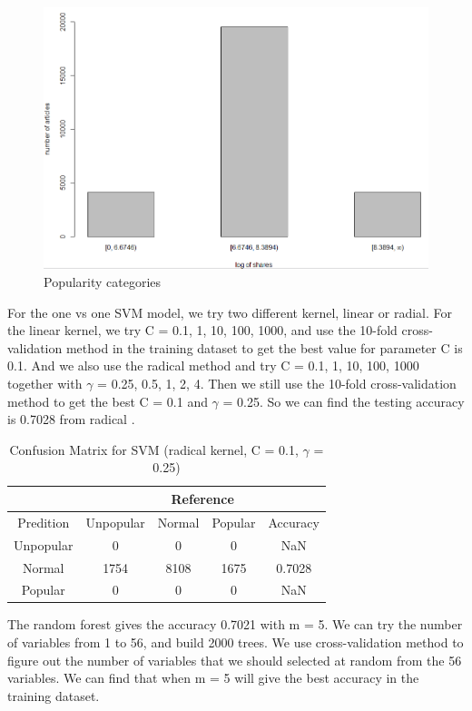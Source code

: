 \documentclass[12pt]{article}
\begin{document}
    \begin{figure}[h]
        \centering
        \includegraphics[width=0.8\linewidth]{poplularity.png}
        \caption{Popularity categories}
    \end{figure}

For the one vs one SVM model, we try two different kernel, linear or radial. For the linear kernel, we try C = 0.1, 1, 10, 100, 1000, and use the 10-fold cross-validation method in the training dataset to get the best value for parameter C is 0.1. And we also use the radical method and try C = 0.1, 1, 10, 100, 1000 together with $\gamma$ = 0.25, 0.5, 1, 2, 4. Then we still use the 10-fold cross-validation method to get the best C = 0.1 and $\gamma$ = 0.25. So we can find the testing accuracy is 0.7028 from radical .

    \begin{table}[h]
        \centering
        \caption{Confusion Matrix for SVM (radical kernel, C = 0.1, $\gamma$ = 0.25)}
        \begin{tabular}{ c | c | c | c | c }
            \hline\hline
            {} & \multicolumn{4}{c}{Reference} \\
            \hline
            Predition & Unpopular & Normal & Popular & Accuracy\\
            \hline
            Unpopular & 0 & 0 & 0 & NaN\\
            \hline
            Normal & 1754 & 8108 & 1675 & 0.7028\\
            \hline
            Popular & 0 & 0 & 0 & NaN\\
            \hline\hline
        \end{tabular}
        \label{table:knn}
    \end{table}

The random forest gives the accuracy 0.7021 with m = 5. We can try the number of variables from 1 to 56, and build 2000 trees. We use cross-validation method to figure out the number of variables that we should selected at random from the 56 variables. We can find that when m = 5 will give the best accuracy in the training dataset. 
\end{document}
